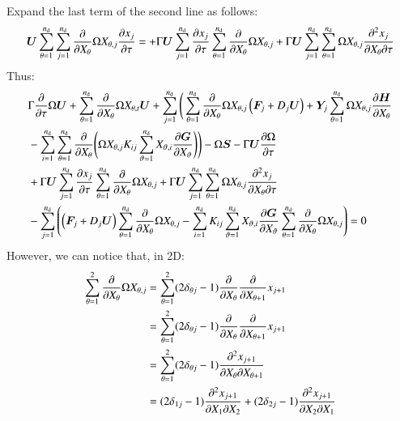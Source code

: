 \documentclass{warpdoc}
\newcommand{\alb}{\vspace{0.2cm}\\} %
\newcommand{\nd}{{{n}_{\rm d}}}
\newcommand{\mfd}{\displaystyle}
\renewcommand{\vec}[1]{\bm{#1}}
\begin{document}
%
Expand the last term of the second line as follows:
%
\begin{equation}
\vec{U} \sum_{\theta=1}^\nd \sum_{j=1}^\nd \frac{\partial }{\partial X_\theta} \Omega X_{\theta,j}\frac{\partial x_j}{\partial \tau}
=
+ \Gamma \vec{U} \mfd\sum_{j=1}^\nd \frac{\partial x_j}{\partial \tau} \sum_{\theta=1}^\nd  \frac{\partial }{\partial X_\theta} \Omega {X_{\theta,j}}
+ \Gamma \vec{U} \mfd\sum_{j=1}^\nd \sum_{\theta=1}^\nd \Omega{X_{\theta,j}} \frac{\partial^2 x_j}{\partial X_\theta \partial \tau}
\end{equation}
%
Thus:
%
\begin{align}
    \mfd&\Gamma \frac{\partial }{\partial \tau} \Omega\vec{U}
     + \sum_{\theta=1}^\nd  \frac{\partial }{\partial X_\theta} \Omega X_{\theta,t} \vec{U}
    + \sum_{j=1}^\nd \Bigg( \sum_{\theta=1}^\nd \frac{\partial}{\partial X_\theta} \Omega X_{\theta,j} \left(\vec{F}_j+D_j \vec{U}\right)+\vec{Y}_j  \sum_{\theta=1}^\nd \Omega X_{\theta,j}\frac{\partial \vec{H}}{\partial X_\theta}
     \nonumber\alb
    &- \sum_{i=1}^\nd \sum_{\theta=1}^\nd   \frac{\partial}{\partial X_\theta}
       \Bigg( \Omega X_{\theta,j} K_{ij} \sum_{\vartheta=1}^\nd X_{\vartheta,i}\frac{\partial \vec{G}}{\partial X_\vartheta} \Bigg)\Bigg)
    - \Omega\vec{S} 
    -\Gamma \vec{U} \frac{\partial \Omega}{\partial \tau}  \nonumber\alb
&+ \Gamma \vec{U} \mfd\sum_{j=1}^\nd \frac{\partial x_j}{\partial \tau} \sum_{\theta=1}^\nd  \frac{\partial }{\partial X_\theta} \Omega {X_{\theta,j}}
+ \Gamma \vec{U} \mfd\sum_{j=1}^\nd \sum_{\theta=1}^\nd \Omega{X_{\theta,j}} \frac{\partial^2 x_j}{\partial X_\theta \partial \tau} \nonumber\alb
    &- \sum_{j=1}^\nd \left( \left(\vec{F}_j+D_j\vec{U}\right) \sum_{\theta=1}^\nd \frac{\partial}{\partial X_\theta} \Omega X_{\theta,j}
    - \sum_{i=1}^\nd K_{ij} \sum_{\vartheta=1}^\nd X_{\vartheta,i}\frac{\partial \vec{G}}{\partial X_\vartheta} \sum_{\theta=1}^\nd   \frac{\partial}{\partial X_\theta}
        \Omega X_{\theta,j}   \right)
    =0
 \label{eqn:goveq6}
\end{align}
%
However, we can notice that, in 2D:
%
\begin{align}
  \sum_{\theta=1}^2   \frac{\partial}{\partial X_\theta}\Omega{X_{\theta,j} }
  &=\sum_{\theta=1}^2 (2\delta_{\theta j}-1) \frac{\partial}{\partial X_\theta}\frac{\partial }{\partial X_{\theta+1}}x_{j+1}\alb\mfd
  &= \sum_{\theta=1}^2 (2\delta_{\theta j}-1) \frac{\partial}{\partial X_\theta}\frac{\partial }{\partial X_{\theta+1}}x_{j+1}\alb\mfd
  &= \sum_{\theta=1}^2 (2\delta_{\theta j}-1) \frac{\partial^2 x_{j+1}}{\partial X_\theta \partial X_{\theta+1}}\alb\mfd
  &= (2\delta_{1 j}-1) \frac{\partial^2 x_{j+1}}{\partial X_1 \partial X_{2}}
  + (2\delta_{2 j}-1) \frac{\partial^2 x_{j+1}}{\partial X_2 \partial X_{1}}
\end{align}
\end{document}
